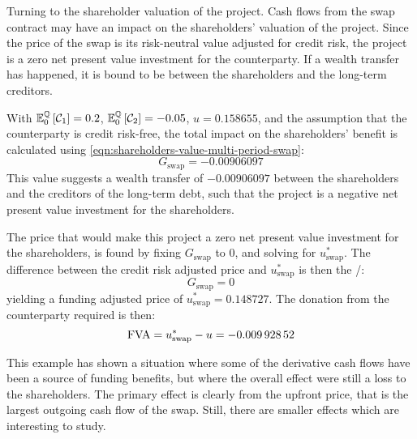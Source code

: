 \documentclass[main.tex]{subfiles}
\begin{document}
        Turning to the shareholder valuation of the project.
        Cash flows from the swap contract may have an impact on the shareholders' valuation of the project.
        Since the price of the swap is its risk-neutral value adjusted for credit risk,
        the project is a zero net present value investment for the counterparty.
        If a wealth transfer has happened, it is bound to be between the shareholders and the long-term creditors.

        With $\mathbb{E}_{0}^{\mathbb{Q}}\left[\mathcal{C}_1\right]=\num{0.2}$,
        $\mathbb{E}_{0}^{\mathbb{Q}}\left[\mathcal{C}_2\right]=\num{-0.05}$,
        $u=\num{0.158655}$,
        and the assumption that the counterparty is credit risk-free,
        the total impact on the shareholders' benefit is calculated using \cref{eqn:shareholders-value-multi-period-swap}:
        \begin{equation*}
            G_{\text{swap}} = \num{-0.00906097}
        \end{equation*}
        This value suggests a wealth transfer of $\num{-0.00906097}$
        between the shareholders and the creditors of the long-term debt,
        such that the project is a negative net present value investment for the shareholders.

        The price that would make this project a zero net present value investment for the shareholders,
        is found by fixing $G_{\text{swap}}$ to 0,
        and solving for $u^{\ast}_{\text{swap}}$.
        The difference between the credit risk adjusted price and $u^{\ast}_{\text{swap}}$ is then the \FVA/:
        \begin{equation*}
            G_{\text{swap}} = 0
        \end{equation*}
        yielding a funding adjusted price of $u^{\ast}_{\text{swap}} = \num{0.148727}$.
        The donation from the counterparty required is then:
        \begin{equation*}
            \FVA/ = u^{\ast}_{\text{swap}} - u = \num{-0.00992852}
        \end{equation*}

        This example has shown a situation where some of the derivative cash flows have
        been a source of funding benefits,
        but where the overall effect were still a loss to the shareholders.
        The primary effect is clearly from the upfront price,
        that is the largest outgoing cash flow of the swap.
        Still, there are smaller effects which are interesting to study.
\end{document}

